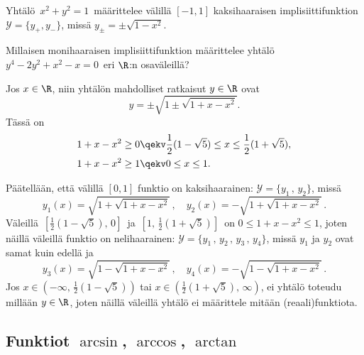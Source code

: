\begin{Exa}
Yhtälö $\,x^2+y^2=1\,$ määrittelee välillä $[-1,1]$ kaksihaaraisen implisiittifunktion
$\mathcal{Y}=\{y_+,y_-\}$, missä $y_\pm = \pm \sqrt{1-x^2}$. \loppu
\end{Exa}
\begin{Exa} Millaisen monihaaraisen implisiittifunktion määrittelee yhtälö \newline
$y^4-2y^2+x^2-x=0\,$ eri $\R$:n osaväleillä?
\end{Exa}
\ratk Jos $x\in\R$, niin yhtälön mahdolliset ratkaisut $y\in\R$ ovat
\[
y=\pm\sqrt{1\pm\sqrt{1+x-x^2}}.
\]
Tässä on
\begin{align*}
1+x-x^2 &\ge 0 \qekv \frac{1}{2}(1-\sqrt{5}) \le x \le \frac{1}{2}(1+\sqrt{5}), \\
1+x-x^2 &\ge 1 \qekv 0 \le x \le 1.
\end{align*}

Päätellään, että välillä $[0,1]$ funktio on kaksihaarainen: $\mathcal{Y}=\{y_1\,,\,y_2\}$,
missä
\[
y_1(x)=\sqrt{1+\sqrt{1+x-x^2}}\,, \quad y_2(x)=-\sqrt{1+\sqrt{1+x-x^2}}\,.
\]
Väleillä $\,[\tfrac{1}{2}(1-\sqrt{5}),\,0]\,$ ja $\,[1,\,\tfrac{1}{2}(1+\sqrt{5})]\,$ on
$0 \le 1+x-x^2 \le 1$, joten näillä väleillä funktio on nelihaarainen: 
$\mathcal{Y}=\{y_1\,,\,y_2\,,\,y_3\,,\,y_4\}$, missä $y_1$ ja $y_2$ ovat samat kuin edellä ja
\[
y_3(x)=\sqrt{1-\sqrt{1+x-x^2}}\,, \quad  y_4(x)=-\sqrt{1-\sqrt{1+x-x^2}}\,.
\]
Jos $x\in(-\infty,\,\tfrac{1}{2}(1-\sqrt{5}))$ tai $x\in(\tfrac{1}{2}(1+\sqrt{5}),\,\infty)$,
ei yhtälö toteudu millään $y\in\R$, joten näillä väleillä yhtälö ei määrittele mitään
(reaali)funktiota. \loppu 

\subsection{Funktiot $\arcsin$, $\arccos$, $\arctan$}


